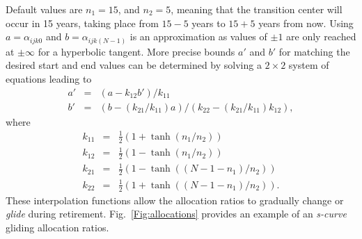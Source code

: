 \documentclass{report}[fleqn,12pt]
\begin{document}
\begin{description}[leftmargin=4em,style=multiline]
	Default values are $n_1 = 15$, and $n_2 = 5$, meaning that the transition center will occur
	in 15 years, taking place from $15-5$ years to $15+5$ years from now.
	Using $a = \alpha_{ijk0}$ and $b = \alpha_{ijk(N-1)}$ is an approximation as values of $\pm 1$
	are only reached at $\pm \infty$ for a hyperbolic tangent.
	More precise bounds $a'$ and $b'$ for matching the desired start and end values
	can be determined by solving a $2\times 2$ system of equations leading to
	\begin{eqnarray}
		a' &=& (a - k_{12}b')/k_{11} \nonumber \\
		b' &=& (b - (k_{21}/k_{11})a)/(k_{22} - (k_{21}/k_{11})k_{12}),
	\end{eqnarray}
	where
	\begin{eqnarray}
		k_{11} &=& \frac{1}{2}(1 + \tanh(n_1/n_2)) \nonumber \\
		k_{12} &=& \frac{1}{2}(1 - \tanh(n_1/n_2)) \nonumber \\
		k_{21} &=& \frac{1}{2}(1 - \tanh((N-1-n_1)/n_2)) \nonumber \\
		k_{22} &=& \frac{1}{2}(1 + \tanh((N-1-n_1)/n_2)).
	\end{eqnarray}
	These interpolation functions allow the allocation ratios to gradually change
	or {\em glide} during retirement. Fig.~\ref{Fig:allocations} provides an example
	of an {\em s-curve} gliding allocation ratios.


\end{description}
\end{document}
